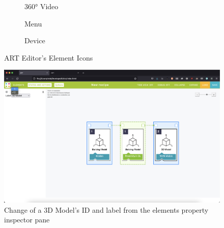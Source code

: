 \begin{figure}[htbp]
    \begin{subfigure}{0.18\textwidth}
        
        \caption{360° Video}
    \end{subfigure}
    \hfill
    \begin{subfigure}{0.18\textwidth}
        
        \caption{Menu}
    \end{subfigure}
    \hfill
    \begin{subfigure}{0.18\textwidth}
        
        \caption{Device}
    \end{subfigure}
    \hfill
    \caption{ART Editor's Element Icons}
    \label{fig:art-editor-elements-icons}
\end{figure}
\begin{figure}[H]
    \centering
    \includegraphics[width=\columnwidth]{Figures/Editor/element-inspector.png}
    \caption{Change of a 3D Model's ID and label from the elements property inspector pane}
    \label{fig:property-inspector}
\end{figure}


